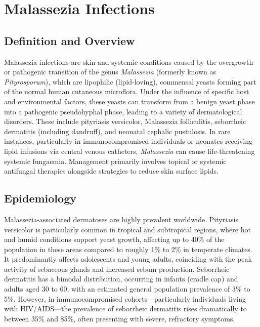 \chapter{Malassezia Infections}

\section*{Definition and Overview}
Malassezia infections are skin and systemic conditions caused by the overgrowth or pathogenic transition of the genus \textit{Malassezia} (formerly known as \textit{Pityrosporum}), which are lipophilic (lipid-loving), commensal yeasts forming part of the normal human cutaneous microflora. Under the influence of specific host and environmental factors, these yeasts can transform from a benign yeast phase into a pathogenic pseudohyphal phase, leading to a variety of dermatological disorders. These include pityriasis versicolor, Malassezia folliculitis, seborrheic dermatitis (including dandruff), and neonatal cephalic pustulosis. In rare instances, particularly in immunocompromised individuals or neonates receiving lipid infusions via central venous catheters, \textit{Malassezia} can cause life-threatening systemic fungaemia. Management primarily involves topical or systemic antifungal therapies alongside strategies to reduce skin surface lipids.

\section*{Epidemiology}
Malassezia-associated dermatoses are highly prevalent worldwide. Pityriasis versicolor is particularly common in tropical and subtropical regions, where hot and humid conditions support yeast growth, affecting up to 40\% of the population in these areas compared to roughly 1\% to 2\% in temperate climates. It predominantly affects adolescents and young adults, coinciding with the peak activity of sebaceous glands and increased sebum production. Seborrheic dermatitis has a bimodal distribution, occurring in infants (cradle cap) and adults aged 30 to 60, with an estimated general population prevalence of 3\% to 5\%. However, in immunocompromised cohorts—particularly individuals living with HIV/AIDS—the prevalence of seborrheic dermatitis rises dramatically to between 35\% and 85\%, often presenting with severe, refractory symptoms.

